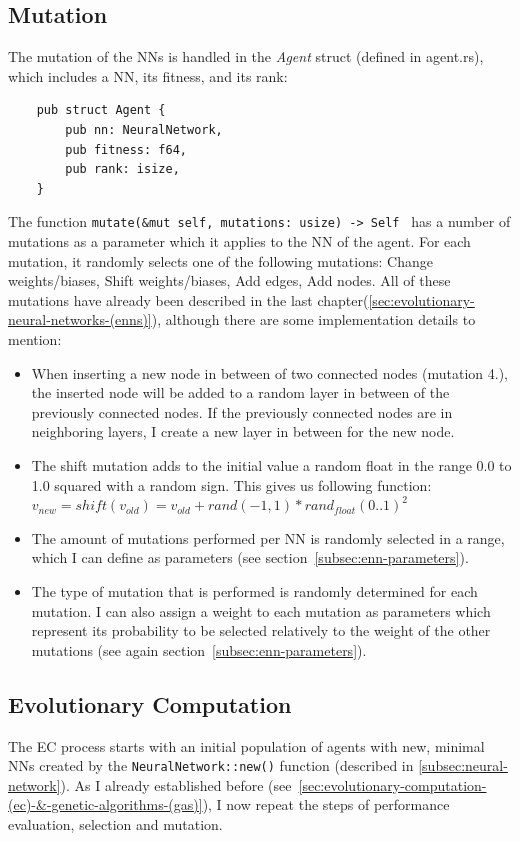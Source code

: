 \documentclass[11pt]{report}
\begin{document}
\begin{enumerate}
    \subsection{Mutation}\label{subsec:mutation}
    The mutation of the NNs is handled in the \textit{Agent} struct (defined in agent.rs), which includes a NN, its fitness, and its rank:
    \begin{verbatim}
    pub struct Agent {
        pub nn: NeuralNetwork,
        pub fitness: f64,
        pub rank: isize,
    }
    \end{verbatim}
    The function \texttt{mutate(&mut self, mutations: usize) -> Self {} } has a number of mutations as a parameter which it applies to the NN of the agent.
    For each mutation, it randomly selects one of the following mutations: Change weights/biases, Shift weights/biases, Add edges, Add nodes.
    All of these mutations have already been described in the last chapter(\ref{sec:evolutionary-neural-networks-(enns)}), although there are some implementation details to mention:
    \begin{itemize}
        \item When inserting a new node in between of two connected nodes (mutation 4.), the inserted node will be added to a random layer in between of the previously connected nodes.
        If the previously connected nodes are in neighboring layers, I create a new layer in between for the new node.
        \item The shift mutation adds to the initial value a random float in the range 0.0 to 1.0 squared with a random sign.
        This gives us following function: \\
        $v_{new} = shift(v_{old}) = v_{old} + rand(-1, 1) * rand_{float}(0..1)^2$
        \item The amount of mutations performed per NN is randomly selected in a range, which I can define as parameters (see section~\ref{subsec:enn-parameters}).
        \item The type of mutation that is performed is randomly determined for each mutation.
        I can also assign a weight to each mutation as parameters which represent its probability to be selected relatively to the weight of the other mutations (see again section~\ref{subsec:enn-parameters}).
    \end{itemize}

    \subsection{Evolutionary Computation}\label{subsec:natural-slection}
    The EC process starts with an initial population of agents with new, minimal NNs created by the \texttt{NeuralNetwork::new()} function (described in \ref{subsec:neural-network}).
    As I already established before (see~\ref{sec:evolutionary-computation-(ec)-&-genetic-algorithms-(gas)}), I now repeat the steps of performance evaluation, selection and mutation.


\end{enumerate}
\end{document}
